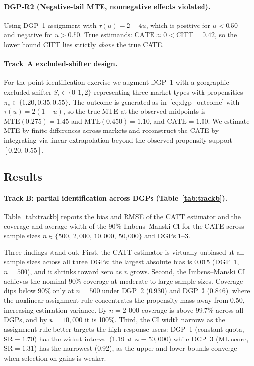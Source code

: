 \documentclass[11pt]{article}
\begin{document}
\paragraph{DGP-R2 (Negative-tail MTE, nonnegative effects violated).}
Using DGP~1 assignment with $\tau(u) = 2 - 4u$,
which is positive for $u < 0.50$ and negative for $u > 0.50$.
True estimands: $\mathrm{CATE} \approx 0 < \mathrm{CITT} = 0.42$, so the lower
bound $\mathrm{CITT}$ lies strictly \emph{above} the true CATE.

\paragraph{Track~A excluded-shifter design.}
For the point-identification exercise we augment DGP~1 with a geographic
excluded shifter $S_i \in \{0,1,2\}$ representing three market types with
propensities $\pi_s \in \{0.20, 0.35, 0.55\}$.  The outcome is generated
as in~\eqref{eq:dgp_outcome} with $\tau(u) = 2(1-u)$, so the true MTE at
the observed midpoints is $\mathrm{MTE}(0.275) = 1.45$ and
$\mathrm{MTE}(0.450) = 1.10$, and $\mathrm{CATE} = 1.00$.  We estimate
MTE by finite differences across markets and reconstruct the CATE by
integrating via linear extrapolation beyond the observed propensity support
$[0.20,\,0.55]$.

\subsection{Results}
\label{subsec:sim_results}

\paragraph{Track B: partial identification across DGPs (Table~\ref{tab:trackb}).}

Table~\ref{tab:trackb} reports the bias and RMSE of the CATT estimator and the
coverage and average width of the 90\% Imbens--Manski CI for the CATE across
sample sizes $n \in \{500,\,2{,}000,\,10{,}000,\,50{,}000\}$ and DGPs 1--3.

Three findings stand out.  First, the CATT estimator is virtually unbiased at
all sample sizes across all three DGPs: the largest absolute bias is $0.015$
(DGP~1, $n=500$), and it shrinks toward zero as $n$ grows.  Second, the
Imbens--Manski CI achieves the nominal 90\% coverage at moderate to large sample
sizes.  Coverage dips below 90\% only at $n=500$ under DGP~2 ($0.930$) and
DGP~3 ($0.846$), where the nonlinear assignment rule concentrates the propensity
mass away from 0.50, increasing estimation variance.  By $n = 2{,}000$ coverage
is above 99.7\% across all DGPs, and by $n = 10{,}000$ it is 100\%.  Third,
the CI width narrows as the assignment rule better targets the high-response
users: DGP~1 (constant quota, $\mathrm{SR} = 1.70$) has the widest interval
(1.19 at $n=50{,}000$) while DGP~3 (ML score, $\mathrm{SR} = 1.31$) has the
narrowest (0.92), as the upper and lower bounds converge when selection on gains
is weaker.
\end{document}
